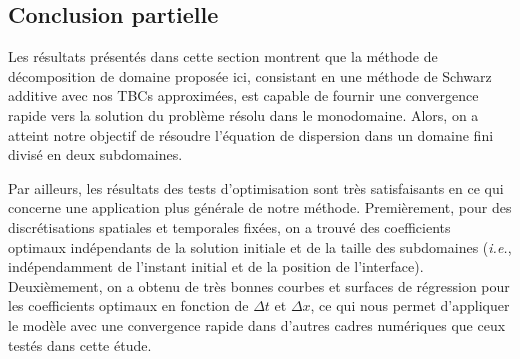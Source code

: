 \subsection{Conclusion partielle}
 
\indent Les résultats présentés dans cette section montrent que la méthode de décomposition de domaine proposée ici, consistant en une méthode de Schwarz additive avec nos TBCs approximées, est capable de fournir une convergence rapide vers la solution du problème résolu dans le monodomaine. Alors, on a atteint notre objectif de résoudre l'équation de dispersion dans un domaine fini divisé en deux subdomaines.

\indent Par ailleurs, les résultats des tests d'optimisation sont très satisfaisants en ce qui concerne une application plus générale de notre méthode. Premièrement, pour des discrétisations spatiales et temporales fixées, on a trouvé des coefficients optimaux indépendants de la solution initiale et de la taille des subdomaines (\emph{i.e.}, indépendamment de l'instant initial et de la position de l'interface).  Deuxièmement, on a obtenu de très bonnes courbes et surfaces de régression pour les coefficients optimaux en fonction de $\Delta t$ et $\Delta x$, ce qui nous permet d'appliquer le modèle avec une convergence rapide dans d'autres cadres numériques que ceux testés dans cette étude.
